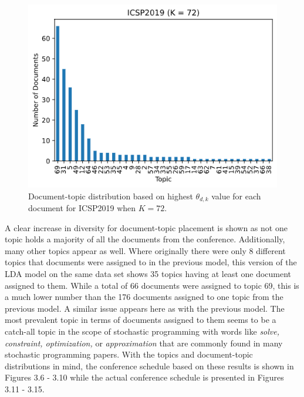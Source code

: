 \documentclass[a4paper, 12pt, twoside]{article}
\numberwithin{equation}{section} %
\begin{document}
\begin{figure}[H]

  \centering
  \includegraphics[width=0.65\linewidth]{ICSP_placement_fixedK.png}
\caption[ICSP2019 conference K document-topic distribution]{Document-topic distribution based on highest $\theta_{d,k}$ value for each document for ICSP2019 when $K=72$.}
\label{fig:ICSP2019 fixed K placements}
\end{figure}

A clear increase in diversity for document-topic placement is shown as not one topic holds a majority of all the documents from the conference. Additionally, many other topics appear as well. Where originally there were only 8 different topics that documents were assigned to in the previous model, this version of the LDA model on the same data set shows 35 topics having at least one document assigned to them. While a total of 66 documents were assigned to topic 69, this is a much lower number than the 176 documents assigned to one topic from the previous model. A similar issue appears here as with the previous model. The most prevalent topic in terms of documents assigned to them seems to be a catch-all topic in the scope of stochastic programming with words like \textit{solve, constraint, optimization,} or \textit{approximation} that are commonly found in many stochastic programming papers. With the topics and document-topic distributions in mind, the conference schedule based on these results is shown in Figures 3.6 - 3.10 while the actual conference schedule is presented in Figures 3.11 - 3.15.

\begin{figure}[H]
\end{figure}
\end{document}
